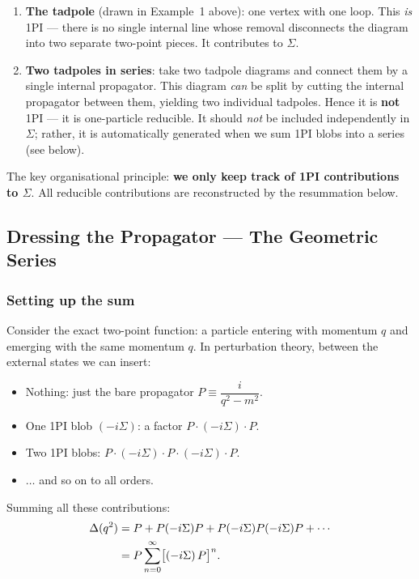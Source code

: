 \documentclass[../main.tex]{subfiles}
\begin{document}
\begin{enumerate}
  \item \textbf{The tadpole} (drawn in Example~1 above): one vertex with one loop.  This \emph{is} 1PI — there is no single internal line whose removal disconnects the diagram into two separate two-point pieces.  It contributes to $\Sigma$.

  \item \textbf{Two tadpoles in series}: take two tadpole diagrams and connect them by a single internal propagator.  This diagram \emph{can} be split by cutting the internal propagator between them, yielding two individual tadpoles.  Hence it is \textbf{not} 1PI — it is one-particle reducible.  It should \emph{not} be included independently in $\Sigma$; rather, it is automatically generated when we sum 1PI blobs into a series (see below).
\end{enumerate}

The key organisational principle: \textbf{we only keep track of 1PI contributions to $\Sigma$}.  All reducible contributions are reconstructed by the resummation below.

\subsection*{Dressing the Propagator — The Geometric Series}

\subsubsection*{Setting up the sum}

Consider the exact two-point function: a particle entering with momentum $q$ and emerging with the same momentum $q$.  In perturbation theory, between the external states we can insert:
\begin{itemize}
  \item Nothing: just the bare propagator $P \equiv \dfrac{i}{q^2 - m^2}$.
  \item One 1PI blob $(-i\Sigma)$: a factor $P \cdot (-i\Sigma) \cdot P$.
  \item Two 1PI blobs: $P \cdot (-i\Sigma) \cdot P \cdot (-i\Sigma) \cdot P$.
  \item $\ldots$ and so on to all orders.
\end{itemize}

Summing all these contributions:
\begin{align}
  \Delta(q^2)
  &= P + P(-i\Sigma)P + P(-i\Sigma)P(-i\Sigma)P + \cdots \notag\\
  &= P\sum_{n=0}^{\infty}\bigl[(-i\Sigma)\,P\bigr]^n.
  \label{eq:lec06:geometric-series}
\end{align}
\end{document}

